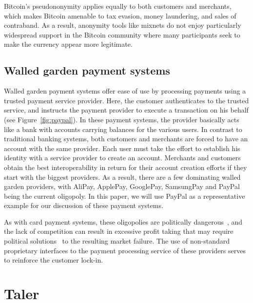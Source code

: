 \documentclass{llncs}
\begin{document}
Bitcoin's pseudononymity applies equally to both customers and
merchants, which makes Bitcoin amen\-able to tax evasion, money
laundering, and sales of contraband.  As a result, anonymity tools
like mixnets do not enjoy particularly widespread support in the
Bitcoin community where many participants seek to make the currency
appear more legitimate.





\subsection{Walled garden payment systems}

Walled garden payment systems offer ease of use by processing payments
using a trusted payment service provider. Here, the customer
authenticates to the trusted service, and instructs the payment
provider to execute a transaction on his behalf
(see Figure~\ref{fig:paypal}).  In these payment systems, the provider
basically acts like a bank with accounts carrying balances for the
various users.  In contrast to traditional banking systems, both
customers and merchants are forced to have an account with the same
provider.  Each user must take the effort to establish his identity
with a service provider to create an account.  Merchants and customers
obtain the best interoperability in return for their account creation
efforts if they start with the biggest providers.  As a result, there
are a few dominating walled garden providers, with AliPay, ApplePay,
GooglePay, SamsungPay and PayPal being the current oligopoly.  In this
paper, we will use PayPal as a representative example for our discussion
of these payment systems.

As with card payment systems, these oligopolies are politically
dangerous~\cite{crinkey2011rundle}, and the lack of competition can
result in excessive profit taking that may require political
solutions~\cite{guardian2015cap} to the resulting market failure.  The
use of non-standard proprietary interfaces to the payment processing
service of these providers serves to reinforce the customer lock-in.


\section{Taler}
\end{document}
